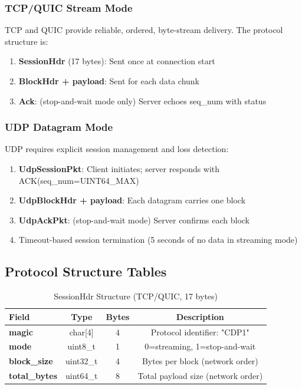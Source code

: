\documentclass[12pt,a4paper]{article}
\begin{document}
\subsubsection{TCP/QUIC Stream Mode}

TCP and QUIC provide reliable, ordered, byte-stream delivery. The protocol structure is:

\begin{tcolorbox}[colback=gray!5,colframe=tcpblue,title=TCP/QUIC Stream Flow]
\begin{enumerate}
  \item \textbf{SessionHdr} (17 bytes): Sent once at connection start
  \item \textbf{BlockHdr + payload}: Sent for each data chunk
  \item \textbf{Ack}: (stop-and-wait mode only) Server echoes seq\_num with status
\end{enumerate}
\end{tcolorbox}

\subsubsection{UDP Datagram Mode}

UDP requires explicit session management and loss detection:

\begin{tcolorbox}[colback=gray!5,colframe=udporange,title=UDP Datagram Flow]
\begin{enumerate}
  \item \textbf{UdpSessionPkt}: Client initiates; server responds with ACK(seq\_num=UINT64\_MAX)
  \item \textbf{UdpBlockHdr + payload}: Each datagram carries one block
  \item \textbf{UdpAckPkt}: (stop-and-wait mode) Server confirms each block
  \item Timeout-based session termination (5 seconds of no data in streaming mode)
\end{enumerate}
\end{tcolorbox}

\subsection{Protocol Structure Tables}

\begin{table}[H]
\centering
\caption{SessionHdr Structure (TCP/QUIC, 17 bytes)}
\begin{tabular}{|l|c|c|c|}
\hline
\textbf{Field} & \textbf{Type} & \textbf{Bytes} & \textbf{Description} \\
\hline
\textbf{magic} & char[4] & 4 & Protocol identifier: "CDP1" \\
\textbf{mode} & uint8\_t & 1 & 0=streaming, 1=stop-and-wait \\
\textbf{block\_size} & uint32\_t & 4 & Bytes per block (network order) \\
\textbf{total\_bytes} & uint64\_t & 8 & Total payload size (network order) \\
\hline
\end{tabular}
\end{table}
\end{document}

